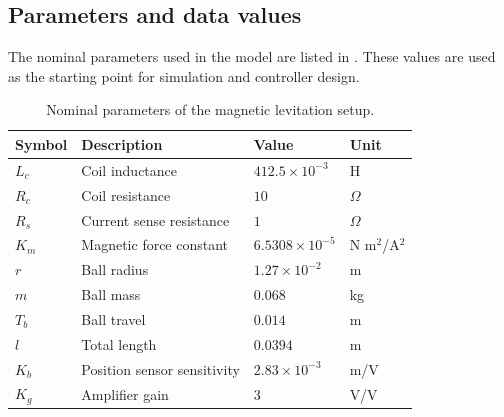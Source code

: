 \subsection{Parameters and data values}

The nominal parameters used in the model are listed in . These values are used as the starting point for simulation and controller design.

\begin{table}[H]
\centering
\caption{Nominal parameters of the magnetic levitation setup.}
\label{tab:parameters}
\begin{tabular}{llll}
\toprule
Symbol & Description & Value & Unit \\
\midrule
$L_c$ & Coil inductance & $412.5\times10^{-3}$ & H \\
$R_c$ & Coil resistance & $10$ & $\Omega$ \\
$R_s$ & Current sense resistance & $1$ & $\Omega$ \\
$K_m$ & Magnetic force constant & $6.5308\times10^{-5}$ & N m$^2$/A$^2$ \\
$r$ & Ball radius & $1.27\times10^{-2}$ & m \\
$m$ & Ball mass & $0.068$ & kg \\
$T_b$ & Ball travel & $0.014$ & m \\
$l$ & Total length & $0.0394$ & m \\
$K_b$ & Position sensor sensitivity & $2.83\times10^{-3}$ & m/V \\
$K_g$ & Amplifier gain & $3$ & V/V \\
\bottomrule
\end{tabular}
\end{table}
